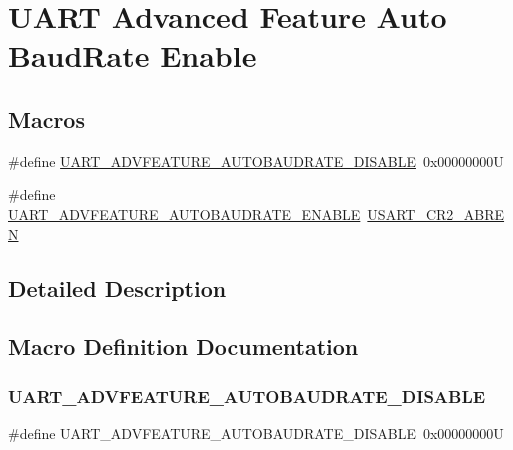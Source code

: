 \hypertarget{group___u_a_r_t___auto_baud_rate___enable}{}\section{U\+A\+RT Advanced Feature Auto Baud\+Rate Enable}
\label{group___u_a_r_t___auto_baud_rate___enable}
\subsection*{Macros}
\begin{DoxyCompactItemize}
\item 
\#define \mbox{\hyperlink{group___u_a_r_t___auto_baud_rate___enable_gaca66b20599569c6b7576f0600050bb61}{U\+A\+R\+T\+\_\+\+A\+D\+V\+F\+E\+A\+T\+U\+R\+E\+\_\+\+A\+U\+T\+O\+B\+A\+U\+D\+R\+A\+T\+E\+\_\+\+D\+I\+S\+A\+B\+LE}}~0x00000000U
\item 
\#define \mbox{\hyperlink{group___u_a_r_t___auto_baud_rate___enable_gad4eee70c6d23721dd95c6a2465e10ca4}{U\+A\+R\+T\+\_\+\+A\+D\+V\+F\+E\+A\+T\+U\+R\+E\+\_\+\+A\+U\+T\+O\+B\+A\+U\+D\+R\+A\+T\+E\+\_\+\+E\+N\+A\+B\+LE}}~\mbox{\hyperlink{group___peripheral___registers___bits___definition_gaaa290a89959d43fecf43f89d66123a0a}{U\+S\+A\+R\+T\+\_\+\+C\+R2\+\_\+\+A\+B\+R\+EN}}
\end{DoxyCompactItemize}


\subsection{Detailed Description}


\subsection{Macro Definition Documentation}
\mbox{\label{group___u_a_r_t___auto_baud_rate___enable_gaca66b20599569c6b7576f0600050bb61}} 
\subsubsection{\texorpdfstring{UART\_ADVFEATURE\_AUTOBAUDRATE\_DISABLE}{UART\_ADVFEATURE\_AUTOBAUDRATE\_DISABLE}}
{\footnotesize\ttfamily \#define U\+A\+R\+T\+\_\+\+A\+D\+V\+F\+E\+A\+T\+U\+R\+E\+\_\+\+A\+U\+T\+O\+B\+A\+U\+D\+R\+A\+T\+E\+\_\+\+D\+I\+S\+A\+B\+LE~0x00000000U}

